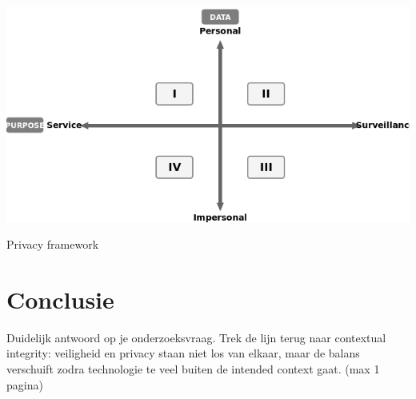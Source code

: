 \documentclass[nonacm,sigconf]{acmart}
\begin{document}
    \figure[ht]
        \centering
        \includegraphics[scale=0.65]{images/SmartCityPrivacy.png}
        \caption{Privacy framework \parencite[Nagemaakt van]{van2016privacy}}
        \label{fig:privacy_framework}
    \endfigure

    \section{Conclusie}
    Duidelijk antwoord op je onderzoeksvraag.
    Trek de lijn terug naar contextual integrity: veiligheid en privacy staan niet los van elkaar, maar de balans verschuift zodra technologie te veel buiten de intended context gaat. (max 1 pagina)

    \printbibliography

    \balance %
\end{document}
